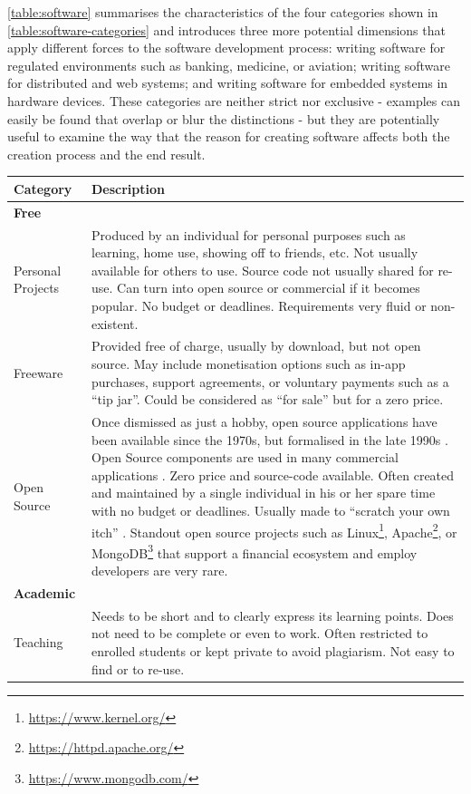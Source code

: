 \autoref{table:software} summarises the characteristics of the four categories shown in \autoref{table:software-categories} and introduces three more potential dimensions that apply different forces to the software development process: writing software for regulated environments such as banking, medicine, or aviation; writing software for distributed and web systems; and writing software for \gls{embedded system}s in hardware devices. These categories are neither strict nor exclusive - examples can easily be found that overlap or blur the distinctions - but they are potentially useful to examine the way that the reason for creating software affects both the creation process and the end result. 

\newpage
\newcommand{\tabitem}{~~\llap{\textbullet}~~}
\begin{longtable}{p{2.5cm} | p{10cm}}
\textbf{Category} & \textbf{Description} \\
\hline
\textbf{Free} & 
\\
Personal Projects & Produced by an individual for personal purposes such as learning, home use, showing off to friends, etc. Not usually available for others to use. Source code not usually shared for re-use. Can turn into open source or commercial if it becomes popular. No budget or deadlines. Requirements very fluid or non-existent.
\\
Freeware & Provided free of charge, usually by download, but not open source. May include monetisation options such as in-app purchases, support agreements, or voluntary payments such as a \enquote{tip jar}. Could be considered as \enquote{for sale} but for a zero price.
\\
Open Source & Once dismissed as just a hobby, open source applications have been available since the 1970s, but formalised in the late 1990s \citep{Bretthauer2001}. Open Source components are used in many commercial applications \citep{Androutsellis-Theotokis2011}. Zero price and source-code available. Often created and maintained by a single individual in his or her spare time with no budget or deadlines. Usually made to \enquote{scratch your own itch} \citep{Raymond1999} \citep{Raymond2010}. Standout open source projects such as Linux\footnote{\url{https://www.kernel.org/}}, Apache\footnote{\url{https://httpd.apache.org/}}, or MongoDB\footnote{\url{https://www.mongodb.com/}} that support a financial ecosystem and employ developers are very rare.
\\
\hline
\textbf{Academic} & \\
Teaching & Needs to be short and to clearly express its learning points. Does not need to be complete or even to work. Often restricted to enrolled students or kept private to avoid plagiarism. Not easy to find or to re-use.

\end{longtable}
